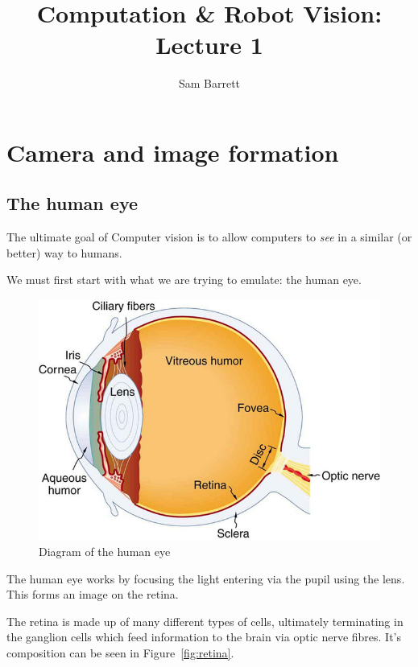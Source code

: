 \documentclass{article}
\title{Computation \& Robot Vision: Lecture 1}
\author{Sam Barrett}
\begin{document}

\maketitle

\section{Camera and image formation}
\label{sec:cif}

\subsection{The human eye}
\label{subsec:human-eye}

The ultimate goal of Computer vision is to allow computers to \textit{see} in a similar (or better) way to humans.

We must first start with what we are trying to emulate: the human eye.

\begin{figure}[ht]
  \centering
  \includegraphics[scale=0.5]{figures/human-eye.jpeg}
  \caption{\label{fig:human-eye} Diagram of the human eye}
\end{figure}

The human eye works by focusing the light entering via the pupil using the lens. This forms an image on the retina.

The retina is made up of many different types of cells, ultimately terminating in the ganglion cells which feed information to the brain via optic nerve fibres. It's composition can be seen in Figure~\ref{fig:retina}.
\end{document}
